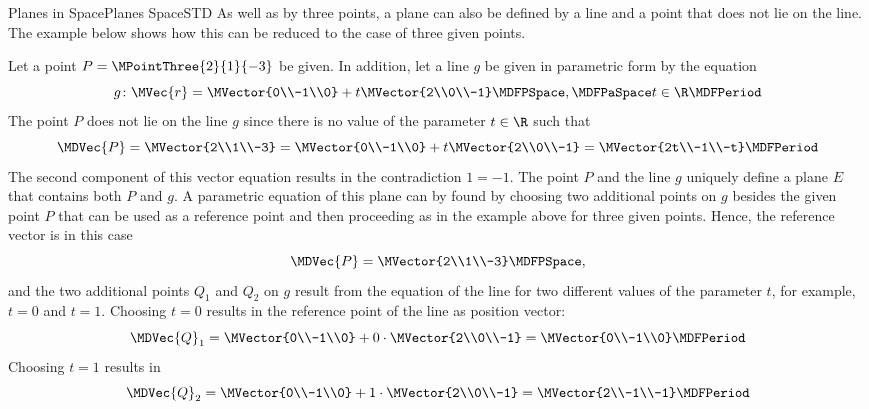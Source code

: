 \begin{MXContent}{Planes in Space}{Planes Space}{STD}
As well as by three points, a plane can also be defined 
by a line and a point that does not lie on the line. The example below shows how this can be 
reduced to the case of three given points.

\begin{MExample}
Let a point $P=\MPointThree{2}{1}{-3}$ be given. In addition, let a line $g$ be given in 
parametric form by the equation
\[
 g\colon \MVec{r}=\MVector{0\\-1\\0}+t\MVector{2\\0\\-1}\MDFPSpace,\MDFPaSpace t\in\R \MDFPeriod
\]
The point $P$ does not lie on the line $g$ since there is no value of the parameter $t\in\R$ such that
\[
 \MDVec{P}=\MVector{2\\1\\-3}=\MVector{0\\-1\\0}+t\MVector{2\\0\\-1}=\MVector{2t\\-1\\-t}\MDFPeriod
\]
The second component of this vector equation results in the contradiction $1=-1$. The point $P$ and the line $g$ uniquely define a plane $E$ that contains both $P$ and $g$. 
A parametric equation of this plane can by found by choosing two additional points on $g$ besides the given point 
$P$ that can be used as a reference point and then proceeding as in the example above for three given 
points. Hence, the reference vector is in this case 
\[
 \MDVec{P}=\MVector{2\\1\\-3} \MDFPSpace,
\]
and the two additional points $Q_1$ and $Q_2$ on $g$ result from the equation of the line for 
two different values of the parameter $t$, for example, $t=0$ and $t=1$. Choosing $t=0$ 
results in the reference point of the line as position vector:
\[
 \MDVec{Q}_1=\MVector{0\\-1\\0}+0\cdot\MVector{2\\0\\-1}=\MVector{0\\-1\\0} \MDFPeriod
\]
Choosing $t=1$ results in
\[
 \MDVec{Q}_2=\MVector{0\\-1\\0}+1\cdot\MVector{2\\0\\-1}=\MVector{2\\-1\\-1} \MDFPeriod
\]
\end{MExample}
\end{MXContent}
